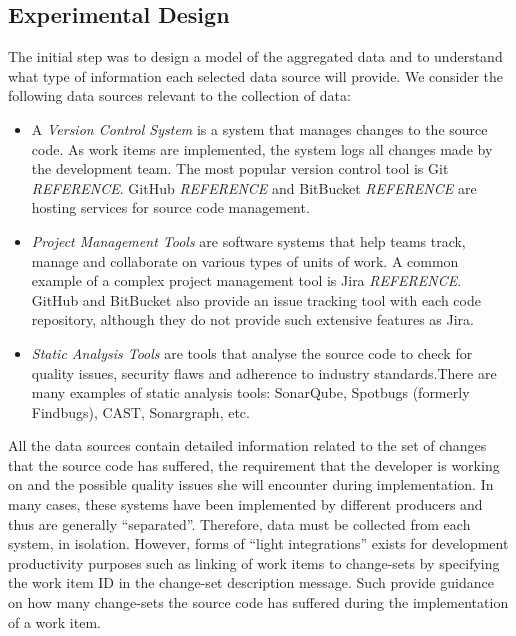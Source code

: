 \documentclass{mpaper}
\begin{document}
\subsection{Experimental Design}
\label{experimental-design}

The initial step was to design a model of the aggregated data and to understand
what type of information each selected data source will provide. We consider the
following data sources relevant to the collection of data:

\begin{itemize}
  \item A \emph{Version Control System} is a system that manages changes to the
  source code. As work items are implemented, the system logs all changes made
  by the development team. The most popular version control tool is Git
  \emph{REFERENCE}. GitHub \emph{REFERENCE} and BitBucket \emph{REFERENCE} are
  hosting services for source code management.

  \item \emph{Project Management Tools} are software systems that help teams
  track, manage and collaborate on various types of units of work. A common
  example of a complex project management tool is Jira \emph{REFERENCE}. GitHub
  and BitBucket also provide an issue tracking tool with each code repository,
  although they do not provide such extensive features as Jira.
  
  \item \emph{Static Analysis Tools} are tools that analyse the source code to
  check for quality issues, security flaws and adherence to industry
  standards.There are many examples of static analysis tools: SonarQube,
  Spotbugs (formerly Findbugs), CAST, Sonargraph, etc.

\end{itemize}

All the data sources contain detailed information related to the set of changes
that the source code has suffered, the requirement that the developer is working
on and the possible quality issues she will encounter during implementation. In
many cases, these systems have been implemented by different producers and thus
are generally ``separated''. Therefore, data must be collected from each system,
in isolation. However, forms of ``light integrations'' exists for development
productivity purposes such as linking of work items to change-sets by specifying
the work item ID in the change-set description message. Such provide guidance on
how many change-sets the source code has suffered during the implementation of a
work item.
\end{document}
